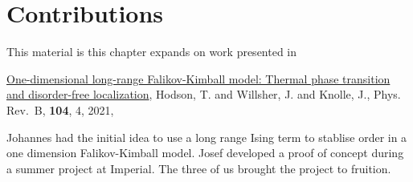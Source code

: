 \hypertarget{contributions}{%
\section{Contributions}\label{contributions}}

This material is this chapter expands on work presented in

\autocite{citekey} \href{https://link.aps.org/doi/10.1103/PhysRevB.104.045116}{One-dimensional long-range Falikov-Kimball model: Thermal phase transition and disorder-free localization}, Hodson, T. and Willsher, J. and Knolle, J., Phys. Rev.~B, \textbf{104}, 4, 2021,

Johannes had the initial idea to use a long range Ising term to stablise order in a one dimension Falikov-Kimball model. Josef developed a proof of concept during a summer project at Imperial. The three of us brought the project to fruition.

